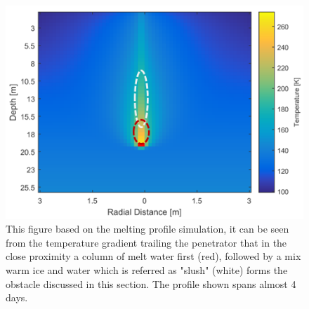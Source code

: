 \begin{figure}[htb]
	\centering
	\includegraphics[width=\textwidth]{figures/comms/slushTrail}
	\caption{This figure based on the melting profile simulation, it can be seen from the temperature gradient trailing the penetrator that in the close proximity a column of melt water first (red), followed by a mix warm ice and water which is referred as "slush" (white) forms the obstacle discussed in this section. The profile shown spans almost 4 days.}
	\label{fig:through-ice_comms}
\end{figure}

